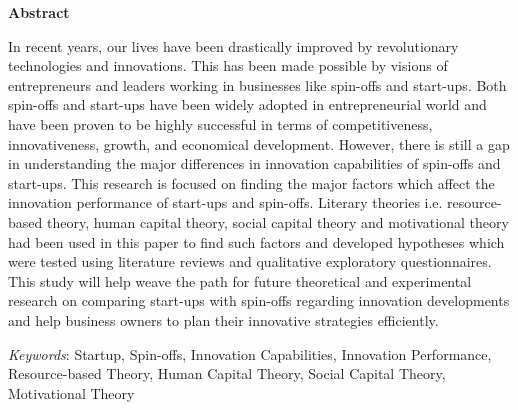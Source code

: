 \thispagestyle{empty}
\vspace*{1.0cm}

\begin{center}
    \textbf{Abstract}
\end{center}

\vspace*{0.5cm}

\noindent
In recent years, our lives have been drastically improved by revolutionary technologies and
innovations. This has been made possible by visions of entrepreneurs and leaders working in
businesses like spin-offs and start-ups. Both spin-offs and start-ups have been widely adopted in
entrepreneurial world and have been proven to be highly successful in terms of competitiveness,
innovativeness, growth, and economical development. However, there is still a gap in understanding the
major differences in innovation capabilities of spin-offs and start-ups. This research is focused
on finding the major factors which affect the innovation performance of start-ups
and spin-offs. Literary theories i.e. resource-based theory, human capital theory, social capital theory and motivational theory had been used in this paper
to find such factors and developed hypotheses which were tested using literature reviews and qualitative exploratory questionnaires. 
This study will help weave the path for future theoretical and experimental research on
comparing start-ups with spin-offs regarding innovation developments and help business owners to plan their innovative
strategies efficiently.
\\
\medskip


\medskip
\noindent \textit{Keywords}: Startup, Spin-offs, Innovation Capabilities, Innovation Performance, Resource-based Theory, Human Capital Theory, Social Capital Theory, Motivational Theory
